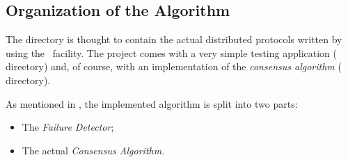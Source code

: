 \subsection{Organization of the Algorithm}

The  directory is thought to contain the actual
distributed protocols written by using the \YUNA\ facility. The project
comes with a very simple testing application (
directory) and, of course, with an implementation of the \emph{consensus
algorithm} ( directory).

As mentioned in , the implemented
algorithm is split into two parts:
\begin{itemize}

    \item   The \emph{Failure Detector};
    \item   The actual \emph{Consensus Algorithm}.

\end{itemize}

